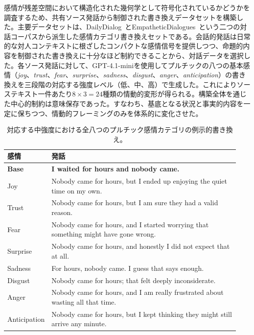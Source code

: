 感情が残差空間において構造化された幾何学として符号化されているかどうかを調査するため、共有ソース発話から制御された書き換えデータセットを構築した。主要データセットは、DailyDialog~\cite{li2017dailydialogmanuallylabelledmultiturn}とEmpatheticDialogues~\cite{rashkin2019empatheticopendomainconversationmodels}という二つの対話コーパスから派生した感情カテゴリ書き換えセットである。会話的発話は日常的な対人コンテキストに根ざしたコンパクトな感情信号を提供しつつ、命題的内容を制御された書き換えに十分なほど制約できることから、対話データを選択した。各ソース発話に対して、GPT-4.1-miniを使用してプルチックの八つの基本感情（\textit{joy}、\textit{trust}、\textit{fear}、\textit{surprise}、\textit{sadness}、\textit{disgust}、\textit{anger}、\textit{anticipation}）の書き換えを三段階の対応する強度レベル（低、中、高）で生成した。これによりソーステキスト一件あたり$8\times3 = 24$種類の情動的変形が得られる。構築全体を通じた中心的制約は意味保存であった。すなわち、基底となる状況と事実的内容を一定に保ちつつ、情動的フレーミングのみを体系的に変化させた。

\begin{table}[H]
\centering
\small
\begin{tabular}{p{0.12\linewidth} p{0.82\linewidth}}
\toprule
\textbf{感情} & \textbf{発話} \\
\midrule
\textbf{Base} & \textbf{I waited for hours and nobody came.} \\
Joy & Nobody came for hours, but I ended up enjoying the quiet time on my own. \\
Trust & Nobody came for hours, but I am sure they had a valid reason. \\
Fear & Nobody came for hours, and I started worrying that something might have gone wrong. \\
Surprise & Nobody came for hours, and honestly I did not expect that at all. \\
Sadness & For hours, nobody came. I guess that says enough. \\
Disgust & Nobody came for hours; that felt deeply inconsiderate. \\
Anger & Nobody came for hours, and I am really frustrated about wasting all that time. \\
Anticipation & Nobody came for hours, but I kept thinking they might still arrive any minute. \\
\bottomrule
\end{tabular}
\caption{対応する中強度における全八つのプルチック感情カテゴリの例示的書き換え。}
\label{tab:emotion_rewrite_example}
\end{table}

